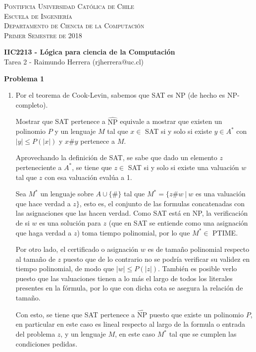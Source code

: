 \documentclass[letterpaper,10pt]{article}
\begin{document}
\small
\textsc{Pontificia Universidad Católica de Chile}\\
\textsc{Escuela de Ingeniería}\\
\textsc{Departamento de Ciencia de la Computación}\\
\textsc{Primer Semestre de 2018}

\large
\begin{center}
\textbf{IIC2213 - Lógica para ciencia de la Computación}\\
Tarea 2 - Raimundo Herrera (rjherrera@uc.cl)
\end{center}

\normalsize
\textbf{Problema 1}

\begin{enumerate}
    \item Por el teorema de Cook-Levin, sabemos que SAT es NP (de hecho es NP-completo).

    Mostrar que SAT pertenece a $\hat{\text{NP}}$ equivale a mostrar que existen un polinomio $P$ y un lenguaje $M$ tal que  $x \in$ SAT si y solo si existe $y \in A^*$ con $|y| \leq P(|x|)$ y $x\#y$ pertenece a $M$.

    Aprovechando la definición de SAT, se sabe que dado un elemento $z$ perteneciente a $A^*$, se tiene que $z \in$ SAT si y solo si existe una valuación $w$ tal que $z$ con esa valuación evalúa a 1.

    Sea $M^*$ un lenguaje sobre $A \cup \{\#\}$ tal que $M^* = \{z\#w \ |\ w$ es una valuación que hace verdad a $z\}$, esto es, el conjunto de las formulas concatenadas con las asignaciones que las hacen verdad. Como SAT está en NP, la verificación de si $w$ es una solución para $z$ (que en SAT se entiende como una asignación que haga verdad a $z$) toma tiempo polinomial, por lo que $M^* \in$ PTIME.

    Por otro lado, el certificado o asignación $w$ es de tamaño polinomial respecto al tamaño de $z$ puesto que de lo contrario no se podría verificar su validez en tiempo polinomial, de modo que $|w| \leq P(|z|)$. También es posible verlo puesto que las valuaciones tienen a lo más el largo de todos los literales presentes en la fórmula, por lo que con dicha cota se asegura la relación de tamaño.

    Con esto, se tiene que SAT pertenece a $\hat{\text{NP}}$ puesto que existe un polinomio $P$, en particular en este caso es lineal respecto al largo de la formula o entrada del problema $z$, y un lenguaje $M$, en este caso $M^*$ tal que se cumplen las condiciones pedidas.


\end{enumerate}
\end{document}
